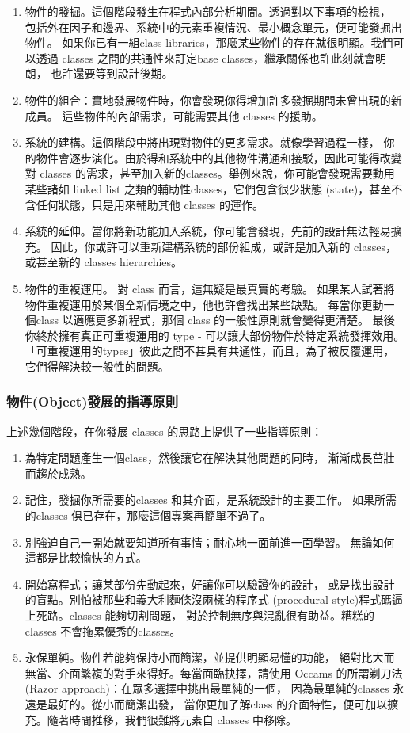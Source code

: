 \begin{enumerate}
\item 物件的發掘。這個階段發生在程式內部分析期間。透過對以下事項的檢視，
包括外在因子和邊界、系統中的元素重複情況、最小概念單元，便可能發掘出物件。
如果你已有一組class libraries，那麼某些物件的存在就很明顯。我們可以透過
classes 之間的共通性來訂定base classes，繼承關係也許此刻就會明朗，
也許還要等到設計後期。
\item 物件的組合：實地發展物件時，你會發現你得增加許多發掘期間未曾出現的新成員。
這些物件的內部需求，可能需要其他 classes 的援助。
\item 系統的建構。這個階段中將出現對物件的更多需求。就像學習過程一樣，
你的物件會逐步演化。由於得和系統中的其他物件溝通和接駁，因此可能得改變對
classes 的需求，甚至加入新的classes。舉例來說，你可能會發現需要動用某些諸如
linked list 之類的輔助性classes，它們包含很少狀態
(state)，甚至不含任何狀態，只是用來輔助其他 classes 的運作。
\item 系統的延伸。當你將新功能加入系統，你可能會發現，先前的設計無法輕易擴充。
因此，你或許可以重新建構系統的部份組成，或許是加入新的 classes，或甚至新的
classes hierarchies。
\item 物件的重複運用。
對 class 而言，這無疑是最真實的考驗。
如果某人試著將物件重複運用於某個全新情境之中，他也許會找出某些缺點。
每當你更動一個class 以適應更多新程式，那個 class 的一般性原則就會變得更清楚。
最後你終於擁有真正可重複運用的 type - 可以讓大部份物件於特定系統發揮效用。
「可重複運用的types」彼此之間不甚具有共通性，而且，為了被反覆運用，
它們得解決較一般性的問題。 
\end{enumerate}

\subsubsection{物件(Object)發展的指導原則}
上述幾個階段，在你發展 classes 的思路上提供了一些指導原則：

\begin{enumerate}
\item 為特定問題產生一個class，然後讓它在解決其他問題的同時，
漸漸成長茁壯而趨於成熟。
\item 記住，發掘你所需要的classes 和其介面，是系統設計的主要工作。
如果所需的classes 俱已存在，那麼這個專案再簡單不過了。
\item 別強迫自己一開始就要知道所有事情；耐心地一面前進一面學習。
無論如何這都是比較愉快的方式。
\item 開始寫程式；讓某部份先動起來，好讓你可以驗證你的設計，
或是找出設計的盲點。別怕被那些和義大利麵條沒兩樣的程序式
(procedural style)程式碼逼上死路。classes 能夠切割問題，
對於控制無序與混亂很有助益。糟糕的classes 不會拖累優秀的classes。
\item 永保單純。物件若能夠保持小而簡潔，並提供明顯易懂的功能，
絕對比大而無當、介面繁複的對手來得好。每當面臨抉擇，請使用
Occams 的所謂剃刀法 (Razor approach)：在眾多選擇中挑出最單純的一個，
因為最單純的classes 永遠是最好的。從小而簡潔出發，
當你更加了解class 的介面特性，便可加以擴充。隨著時間推移，我們很難將元素自
classes 中移除。
\end{enumerate}


